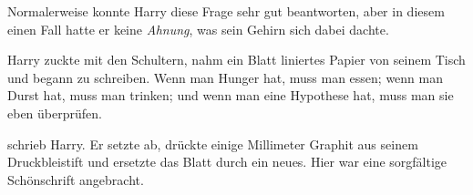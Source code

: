 Normalerweise konnte Harry diese Frage sehr gut beantworten, aber in diesem einen Fall hatte er keine \emph{Ahnung}, was sein Gehirn sich dabei dachte.


Harry zuckte mit den Schultern, nahm ein Blatt liniertes Papier von seinem Tisch und begann zu schreiben. Wenn man Hunger hat, muss man essen; wenn man Durst hat, muss man trinken; und wenn man eine Hypothese hat, muss man sie eben überprüfen.

\begin{writtenNote}
\end{writtenNote}

\noindent schrieb Harry. Er setzte ab, drückte einige Millimeter Graphit aus seinem Druckbleistift und ersetzte das Blatt durch ein neues. Hier war eine sorgfältige Schönschrift angebracht.

